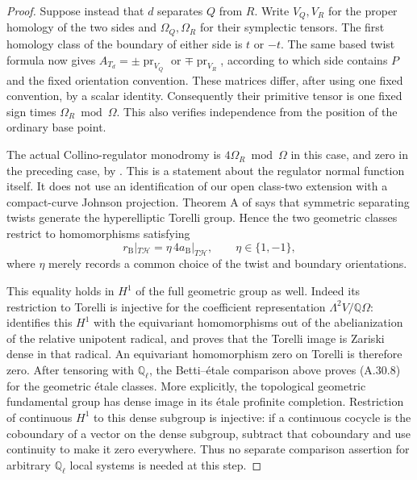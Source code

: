 \begin{proof}
Suppose instead that $d$ separates $Q$ from $R$.
Write $V_Q,V_R$ for the proper homology of the
two sides and $\Omega_Q,\Omega_R$ for their
symplectic tensors. The first homology class
of the boundary of either side is $t$ or $-t$.
The same based twist formula now gives
$A_{T_d}=\pm\operatorname{pr}_{V_Q}$ or
$\mp\operatorname{pr}_{V_R}$, according to
which side contains $P$ and the fixed orientation
convention. These matrices differ, after using
one fixed convention, by a scalar identity.
Consequently their primitive tensor is one
fixed sign times $\Omega_R\bmod\Omega$.
This also verifies independence from the
position of the ordinary base point.

The actual Collino-regulator monodromy is
$4\Omega_R\bmod\Omega$ in this case, and zero
in the preceding case, by
\cite[Theorem 8.7]{fghLuoWatanabe}.
This is a statement about the regulator
normal function itself. It does not use an
identification of our open class-two extension
with a compact-curve Johnson projection.
Theorem A of
\cite{fghBrendleMargalitPutman}
says that symmetric separating twists generate
the hyperelliptic Torelli group. Hence the two
geometric classes restrict to homomorphisms
satisfying
\[
                    r_{\mathrm B}|_{T\mathcal H}
                         =\eta\,4a_{\mathrm B}|_{T\mathcal H},
                  \qquad \eta\in\{1,-1\},
                                                        \tag{A.30.8}
\]
where $\eta$ merely records a common choice of
the twist and boundary orientations.

This equality holds in $H^1$ of the full geometric
group as well. Indeed its restriction to Torelli
is injective for the coefficient representation
$\Lambda^2V/\mathbb Q\Omega$:
\cite[Theorem 5.1 and Section 5.3]{fghLuoWatanabe}
identifies this $H^1$ with the equivariant
homomorphisms out of the abelianization of
the relative unipotent radical, and proves
that the Torelli image is Zariski dense in
that radical. An equivariant homomorphism
zero on Torelli is therefore zero.
After tensoring with $\mathbb Q_\ell$, the
Betti--\'etale comparison above proves
(A.30.8) for the geometric \'etale classes.
More explicitly, the topological geometric
fundamental group has dense image in its
\'etale profinite completion. Restriction
of continuous $H^1$ to this dense subgroup
is injective: if a continuous cocycle is
the coboundary of a vector on the dense
subgroup, subtract that coboundary and
use continuity to make it zero everywhere.
Thus no separate comparison assertion for
arbitrary $\mathbb Q_\ell$ local systems
is needed at this step.


\end{proof}
